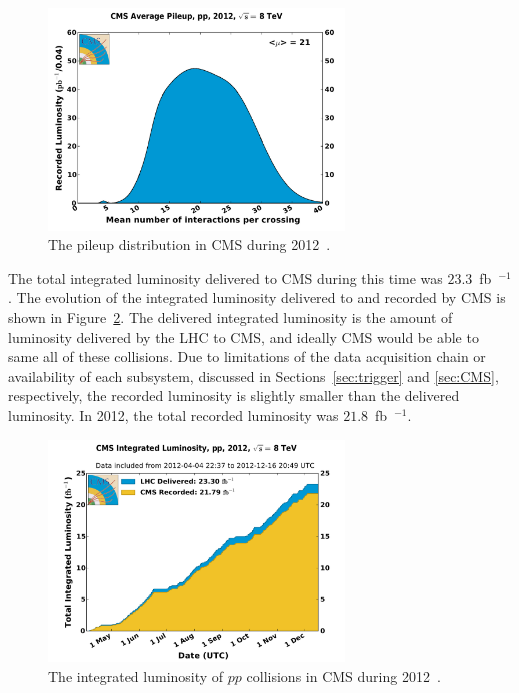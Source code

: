 \begin{figure}[ht]
 \begin{center}
    \includegraphics[width=0.70\textwidth]{figures/experiment/pileup_pp_2012.pdf}
      \end{center}
\caption{The pileup distribution in CMS during 2012~\cite{CMS:lumi}.}
\label{fig:pileup2012}
\end{figure}

The total integrated luminosity delivered to CMS during this time was $23.3$~fb~$^{-1}$.
The evolution of the integrated luminosity delivered to and recorded by CMS is shown in
Figure~\ref{fig:integratedlumi2012}. The delivered integrated luminosity is the amount of
luminosity delivered by the LHC to CMS, and ideally CMS would be able to same all of these collisions.
Due to limitations of the data acquisition chain or availability of each subsystem, discussed in
Sections~\ref{sec:trigger} and \ref{sec:CMS}, respectively, the recorded luminosity
is slightly smaller than the delivered luminosity.
In 2012, the total recorded luminosity was $21.8$~fb~$^{-1}$.

\begin{figure}[ht]
 \begin{center}
    \includegraphics[width=0.70\textwidth]{figures/experiment/int_lumi_per_day_cumulative_pp_2012.pdf}
      \end{center}
\caption{The integrated luminosity of $pp$ collisions in CMS during 2012~\cite{CMS:lumi}.}
\label{fig:integratedlumi2012}
\end{figure}

